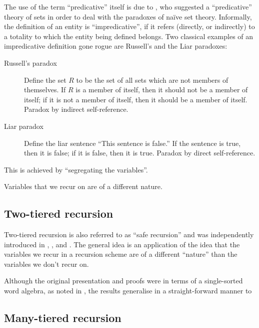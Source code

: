 The use of the term ``predicative'' itself is due to \cite{russell-1907}, who
suggested a ``predicative'' theory of sets in order to deal with the paradoxes
of na\"ive set theory. Informally, the definition of an entity is
``impredicative''\cite{goedel-1944}, if it refers (directly, or indirectly) to
a totality to which the entity being defined belongs. Two classical examples of
an impredicative definition gone rogue are Russell's and the Liar paradoxes: 

\begin{description}

\item [Russell's paradox] Define the set $R$ to be the set of all sets which
are not members of themselves. If $R$ is a member of itself, then it should not
be a member of itself; if it is not a member of itself, then it should be a
member of itself. Paradox by indirect self-reference.

\item [Liar paradox] Define the liar sentence ``This sentence is false.'' If
the sentence is true, then it is false; if it is false, then it is true.
Paradox by direct self-reference.

\end{description} 



This is achieved by ``segregating the variables''.

Variables that we recur on are of a different nature.

\subsection{Two-tiered recursion}

Two-tiered recursion is also referred to as ``safe recursion'' and was
independently introduced in \cite{simmons-1988}, \cite{leivant-1990}, and
\cite{bellantoni-cook-1992}. The general idea is an application of the idea that the variables we recur in a recursion scheme are of a different ``nature'' than the variables we don't recur on.


Although the original presentation and proofs were in terms of a single-sorted word algebra, as noted in \cite[]{bellantoni-cook-1992}, the results generalise in a straight-forward manner to 

\subsection{Many-tiered recursion}


